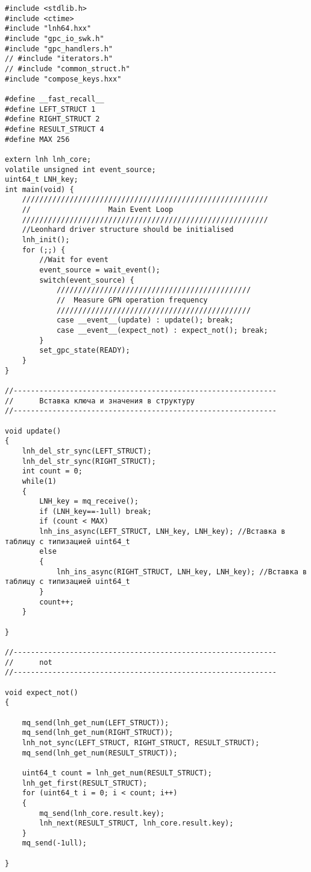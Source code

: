 \begin{lstlisting}[label=lst:swkernel,caption=Измененный код sw\_kernel под индивидульное задание]
#include <stdlib.h>
#include <ctime>
#include "lnh64.hxx"
#include "gpc_io_swk.h"
#include "gpc_handlers.h"
// #include "iterators.h"
// #include "common_struct.h"
#include "compose_keys.hxx"

#define __fast_recall__
#define LEFT_STRUCT 1
#define RIGHT_STRUCT 2
#define RESULT_STRUCT 4
#define MAX 256

extern lnh lnh_core;
volatile unsigned int event_source;
uint64_t LNH_key;
int main(void) {
	/////////////////////////////////////////////////////////
	//                  Main Event Loop
	/////////////////////////////////////////////////////////
	//Leonhard driver structure should be initialised
	lnh_init();
	for (;;) {
		//Wait for event
		event_source = wait_event();
		switch(event_source) {
			/////////////////////////////////////////////
			//  Measure GPN operation frequency
			/////////////////////////////////////////////
			case __event__(update) : update(); break;
			case __event__(expect_not) : expect_not(); break;
		}
		set_gpc_state(READY);
	}
}

//-------------------------------------------------------------
//      Вставка ключа и значения в структуру
//-------------------------------------------------------------

void update()
{
	lnh_del_str_sync(LEFT_STRUCT);
	lnh_del_str_sync(RIGHT_STRUCT);
	int count = 0;
	while(1)
	{
		LNH_key = mq_receive();
		if (LNH_key==-1ull) break;
		if (count < MAX)
		lnh_ins_async(LEFT_STRUCT, LNH_key, LNH_key); //Вставка в таблицу с типизацией uint64_t
		else 
		{
			lnh_ins_async(RIGHT_STRUCT, LNH_key, LNH_key); //Вставка в таблицу с типизацией uint64_t
		}
		count++;
	} 
	
}

//-------------------------------------------------------------
//      not
//-------------------------------------------------------------

void expect_not() 
{
	
	mq_send(lnh_get_num(LEFT_STRUCT));
	mq_send(lnh_get_num(RIGHT_STRUCT));
	lnh_not_sync(LEFT_STRUCT, RIGHT_STRUCT, RESULT_STRUCT);
	mq_send(lnh_get_num(RESULT_STRUCT));
	
	uint64_t count = lnh_get_num(RESULT_STRUCT);
	lnh_get_first(RESULT_STRUCT);
	for (uint64_t i = 0; i < count; i++)
	{
		mq_send(lnh_core.result.key);
		lnh_next(RESULT_STRUCT, lnh_core.result.key);
	}
	mq_send(-1ull);
	
}

\end{lstlisting}

